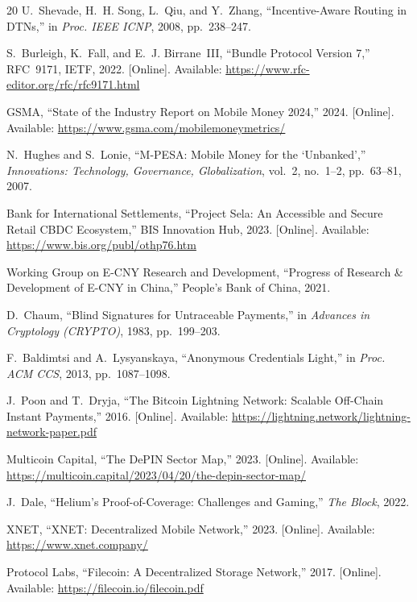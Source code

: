 \documentclass[11pt,a4paper]{article}
\begin{document}
\begin{thebibliography}{20}
U.~Shevade, H.~H. Song, L.~Qiu, and Y.~Zhang, ``Incentive-Aware Routing in DTNs,'' in \textit{Proc. IEEE ICNP}, 2008, pp.~238--247.

S.~Burleigh, K.~Fall, and E.~J. Birrane~III, ``Bundle Protocol Version 7,'' RFC~9171, IETF, 2022. [Online]. Available: \url{https://www.rfc-editor.org/rfc/rfc9171.html}

GSMA, ``State of the Industry Report on Mobile Money 2024,'' 2024. [Online]. Available: \url{https://www.gsma.com/mobilemoneymetrics/}

N.~Hughes and S.~Lonie, ``M-PESA: Mobile Money for the `Unbanked','' \textit{Innovations: Technology, Governance, Globalization}, vol.~2, no.~1--2, pp.~63--81, 2007.

Bank for International Settlements, ``Project Sela: An Accessible and Secure Retail CBDC Ecosystem,'' BIS Innovation Hub, 2023. [Online]. Available: \url{https://www.bis.org/publ/othp76.htm}

Working Group on E-CNY Research and Development, ``Progress of Research \& Development of E-CNY in China,'' People's Bank of China, 2021.

D.~Chaum, ``Blind Signatures for Untraceable Payments,'' in \textit{Advances in Cryptology (CRYPTO)}, 1983, pp.~199--203.

F.~Baldimtsi and A.~Lysyanskaya, ``Anonymous Credentials Light,'' in \textit{Proc. ACM CCS}, 2013, pp.~1087--1098.

J.~Poon and T.~Dryja, ``The Bitcoin Lightning Network: Scalable Off-Chain Instant Payments,'' 2016. [Online]. Available: \url{https://lightning.network/lightning-network-paper.pdf}

Multicoin Capital, ``The DePIN Sector Map,'' 2023. [Online]. Available: \url{https://multicoin.capital/2023/04/20/the-depin-sector-map/}

J.~Dale, ``Helium's Proof-of-Coverage: Challenges and Gaming,'' \textit{The Block}, 2022.

XNET, ``XNET: Decentralized Mobile Network,'' 2023. [Online]. Available: \url{https://www.xnet.company/}

Protocol Labs, ``Filecoin: A Decentralized Storage Network,'' 2017. [Online]. Available: \url{https://filecoin.io/filecoin.pdf}


\end{thebibliography}
\end{document}
